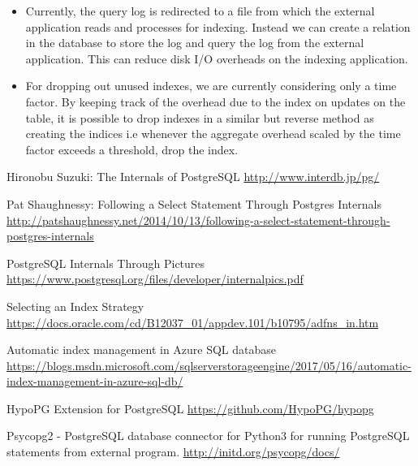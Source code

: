 \documentclass[runningheads]{llncs}
\begin{document}
\begin{itemize}
    \item Currently, the query log is redirected to a file from which the external application reads and processes for indexing. Instead we can create a relation in the database to store the log and query the log from the external application. This can reduce disk I/O overheads on the indexing application.
    \item For dropping out unused indexes, we are currently considering only a time factor. By keeping track of the overhead due to the index on updates on the table, it is possible to drop indexes in a similar but reverse method as creating the indices i.e whenever the aggregate overhead scaled by the time factor exceeds a threshold, drop the index.
\end{itemize}


%
%
%
% 
% 
%
\begin{thebibliography}{8}

Hironobu Suzuki: The Internals of PostgreSQL 
\url{http://www.interdb.jp/pg/}

Pat Shaughnessy: Following a Select Statement Through Postgres Internals \url{http://patshaughnessy.net/2014/10/13/following-a-select-statement-through-postgres-internals}

PostgreSQL Internals Through Pictures \url{https://www.postgresql.org/files/developer/internalpics.pdf}

Selecting an Index Strategy \url{https://docs.oracle.com/cd/B12037_01/appdev.101/b10795/adfns_in.htm}

Automatic index management in Azure SQL database
\url{https://blogs.msdn.microsoft.com/sqlserverstorageengine/2017/05/16/automatic-index-management-in-azure-sql-db/}

HypoPG Extension for PostgreSQL
\url{https://github.com/HypoPG/hypopg}

Psycopg2 - PostgreSQL database connector for Python3 for running PostgreSQL statements from external program.
\url{http://initd.org/psycopg/docs/}

\end{thebibliography}
\end{document}
